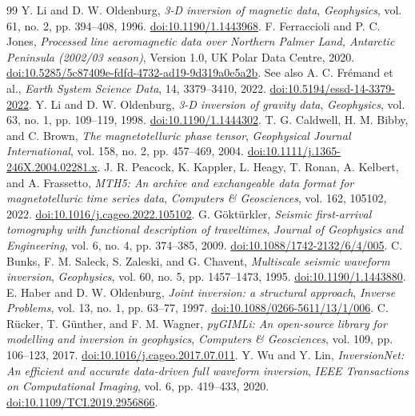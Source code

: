 \documentclass[11pt]{article}
\begin{document}
\begin{thebibliography}{99}
 Y. Li and D. W. Oldenburg, \emph{3-D inversion of magnetic data}, \emph{Geophysics}, vol. 61, no. 2, pp. 394--408, 1996. \href{https://doi.org/10.1190/1.1443968}{doi:10.1190/1.1443968}.
 F. Ferraccioli and P. C. Jones, \emph{Processed line aeromagnetic data over Northern Palmer Land, Antarctic Peninsula (2002/03 season)}, Version 1.0, UK Polar Data Centre, 2020. \href{https://doi.org/10.5285/5c87409e-fdfd-4732-ad19-9d319a0e5a2b}{doi:10.5285/5c87409e-fdfd-4732-ad19-9d319a0e5a2b}. See also A. C. Fr\'emand et al., \emph{Earth System Science Data}, 14, 3379--3410, 2022. \href{https://doi.org/10.5194/essd-14-3379-2022}{doi:10.5194/essd-14-3379-2022}.
 Y. Li and D. W. Oldenburg, \emph{3-D inversion of gravity data}, \emph{Geophysics}, vol. 63, no. 1, pp. 109--119, 1998. \href{https://doi.org/10.1190/1.1444302}{doi:10.1190/1.1444302}.
 T. G. Caldwell, H. M. Bibby, and C. Brown, \emph{The magnetotelluric phase tensor}, \emph{Geophysical Journal International}, vol. 158, no. 2, pp. 457--469, 2004. \href{https://doi.org/10.1111/j.1365-246X.2004.02281.x}{doi:10.1111/j.1365-246X.2004.02281.x}.
 J. R. Peacock, K. Kappler, L. Heagy, T. Ronan, A. Kelbert, and A. Frassetto, \emph{MTH5: An archive and exchangeable data format for magnetotelluric time series data}, \emph{Computers \& Geosciences}, vol. 162, 105102, 2022. \href{https://doi.org/10.1016/j.cageo.2022.105102}{doi:10.1016/j.cageo.2022.105102}.
 G. Göktürkler, \emph{Seismic first-arrival tomography with functional description of traveltimes}, \emph{Journal of Geophysics and Engineering}, vol. 6, no. 4, pp. 374--385, 2009. \href{https://doi.org/10.1088/1742-2132/6/4/005}{doi:10.1088/1742-2132/6/4/005}.
 C. Bunks, F. M. Saleck, S. Zaleski, and G. Chavent, \emph{Multiscale seismic waveform inversion}, \emph{Geophysics}, vol. 60, no. 5, pp. 1457--1473, 1995. \href{https://doi.org/10.1190/1.1443880}{doi:10.1190/1.1443880}.
 E. Haber and D. W. Oldenburg, \emph{Joint inversion: a structural approach}, \emph{Inverse Problems}, vol. 13, no. 1, pp. 63--77, 1997. \href{https://doi.org/10.1088/0266-5611/13/1/006}{doi:10.1088/0266-5611/13/1/006}.
 C. Rücker, T. Günther, and F. M. Wagner, \emph{pyGIMLi: An open-source library for modelling and inversion in geophysics}, \emph{Computers \& Geosciences}, vol. 109, pp. 106--123, 2017. \href{https://doi.org/10.1016/j.cageo.2017.07.011}{doi:10.1016/j.cageo.2017.07.011}.
 Y. Wu and Y. Lin, \emph{InversionNet: An efficient and accurate data-driven full waveform inversion}, \emph{IEEE Transactions on Computational Imaging}, vol. 6, pp. 419--433, 2020. \href{https://doi.org/10.1109/TCI.2019.2956866}{doi:10.1109/TCI.2019.2956866}.

\end{thebibliography}
\end{document}
